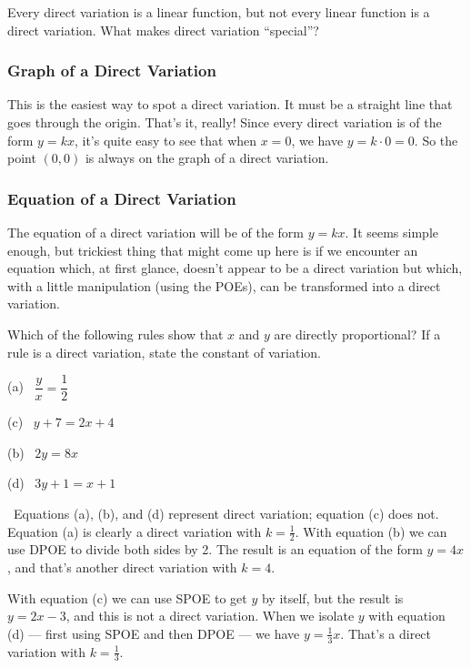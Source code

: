 Every direct variation is a linear function, but not every linear function is a direct variation. What makes direct variation ``special''?

\subsubsection{Graph of a Direct Variation}

This is the easiest way to spot a direct variation. It must be a straight line that goes through the origin. That's it, really! Since every direct variation is of the form $y=kx$, it's quite easy to see that when $x=0$, we have $y = k\cdot0 = 0$. So the point $(0,0)$ is always on the graph of a direct variation.

\subsubsection{Equation of a Direct Variation}

The equation of a direct variation will be of the form $y = kx$. It seems simple enough, but trickiest thing that might come up here is if we encounter an equation which, at first glance, doesn't appear to be a direct variation but which, with a little manipulation (using the POEs), can be transformed into a direct variation.

\begin{boxedex}
Which of the following rules show that $x$ and $y$ are directly proportional? If a rule is a direct variation, state the constant of variation.

\begin{center}
\begin{minipage}{0.4\linewidth}
(a)~ $\dfrac{y}{x} = \dfrac{1}{2}$

(c)~ $y + 7 = 2x + 4$
\end{minipage}
%
\begin{minipage}{0.4\linewidth}
(b)~ $2y = 8x$

(d)~ $3y + 1 = x + 1$
\end{minipage}
\end{center}

\exsoln\ Equations (a), (b), and (d) represent direct variation; equation (c) does not. Equation (a) is clearly a direct variation with $k = \frac{1}{2}$. With equation (b) we can use DPOE to divide both sides by 2. The result is an equation of the form $y=4x$, and that's another direct variation with $k=4$.

With equation (c) we can use SPOE to get $y$ by itself, but the result is $y = 2x-3$, and this is not a direct variation. When we isolate $y$ with equation (d) --- first using SPOE and then DPOE --- we have $y = \frac{1}{3}x$. That's a direct variation with $k=\frac{1}{3}$.
\end{boxedex}

